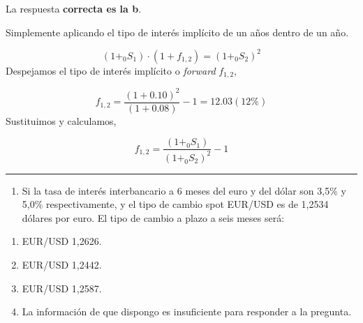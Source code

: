 \documentclass[
  letterpaper,
  DIV=11,
  numbers=noendperiod]{scrreprt}
\providecommand{\tightlist}{%
  \setlength{\itemsep}{0pt}\setlength{\parskip}{0pt}}\usepackage{longtable,booktabs,array}
\begin{document}
\begin{tcolorbox}[enhanced jigsaw, left=2mm, opacityback=0, colback=white, breakable, arc=.35mm, bottomrule=.15mm, rightrule=.15mm, toprule=.15mm, leftrule=.75mm, colframe=quarto-callout-tip-color-frame]
\begin{minipage}[t]{5.5mm}
\textcolor{quarto-callout-tip-color}{\faLightbulb}
\end{minipage}%
\begin{minipage}[t]{\textwidth - 5.5mm}

La respuesta \textbf{correcta es la b}.

Simplemente aplicando el tipo de interés implícito de un años dentro de
un año.

\[(1+_{0}S_{1})\cdot(1+f_{1,2})=(1+_{0}S_{2})^{2}\] Despejamos el tipo
de interés implícito o \emph{forward} \(f_{1,2}\),

\[f_{1,2}=\frac{(1+0.10)^{2} }{(1+0.08) }-1=12.03(12\%)\] Sustituimos y
calculamos,

\[f_{1,2}=\frac{(1+_{0}S_{1}) }{ (1+_{0}S_{2})^{2}}-1\]

\end{minipage}%
\end{tcolorbox}

\begin{center}\rule{0.5\linewidth}{0.5pt}\end{center}

\begin{enumerate}
\def\labelenumi{\arabic{enumi}.}
\setcounter{enumi}{24}
\tightlist
\item
  Si la tasa de interés interbancario a 6 meses del euro y del dólar son
  3,5\% y 5,0\% respectivamente, y el tipo de cambio spot EUR/USD es de
  1,2534 dólares por euro. El tipo de cambio a plazo a seis meses será:
\end{enumerate}

\begin{enumerate}
\def\labelenumi{\alph{enumi})}
\item
  EUR/USD 1,2626.
\item
  EUR/USD 1,2442.
\item
  EUR/USD 1,2587.
\item
  La información de que dispongo es insuficiente para responder a la
  pregunta.
\end{enumerate}
\end{document}
